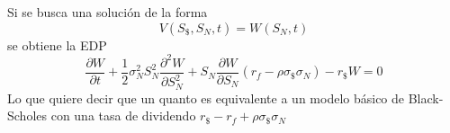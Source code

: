 Si se busca una solución de la forma
\[
    V(S_\$, S_N, t) = W(S_N, t)
\]
se obtiene la EDP
\[
    \frac{\partial W}{\partial t} + \frac{1}{2} \sigma_N^2 S_N^2 \frac{\partial^2 W}{\partial S_N^2} + S_N \frac{\partial W}{\partial S_N} \left( r_f - \rho \sigma_\$ \sigma_N \right) - r_\$ W = 0
\]
Lo que quiere decir que un quanto es equivalente a un modelo básico de Black-Scholes con una tasa de dividendo $r_\$ - r_f + \rho \sigma_\$ \sigma_N$













